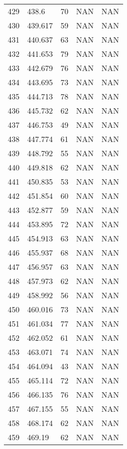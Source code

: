 \documentclass{article}
\begin{document}
\begin{longtable}{@{}lllll@{}}
				429 & 438.6   & 70    & NAN   & NAN   \\
				430 & 439.617 & 59    & NAN   & NAN   \\
				431 & 440.637 & 63    & NAN   & NAN   \\
				432 & 441.653 & 79    & NAN   & NAN   \\
				433 & 442.679 & 76    & NAN   & NAN   \\
				434 & 443.695 & 73    & NAN   & NAN   \\
				435 & 444.713 & 78    & NAN   & NAN   \\
				436 & 445.732 & 62    & NAN   & NAN   \\
				437 & 446.753 & 49    & NAN   & NAN   \\
				438 & 447.774 & 61    & NAN   & NAN   \\
				439 & 448.792 & 55    & NAN   & NAN   \\
				440 & 449.818 & 62    & NAN   & NAN   \\
				441 & 450.835 & 53    & NAN   & NAN   \\
				442 & 451.854 & 60    & NAN   & NAN   \\
				443 & 452.877 & 59    & NAN   & NAN   \\
				444 & 453.895 & 72    & NAN   & NAN   \\
				445 & 454.913 & 63    & NAN   & NAN   \\
				446 & 455.937 & 68    & NAN   & NAN   \\
				447 & 456.957 & 63    & NAN   & NAN   \\
				448 & 457.973 & 62    & NAN   & NAN   \\
				449 & 458.992 & 56    & NAN   & NAN   \\
				450 & 460.016 & 73    & NAN   & NAN   \\
				451 & 461.034 & 77    & NAN   & NAN   \\
				452 & 462.052 & 61    & NAN   & NAN   \\
				453 & 463.071 & 74    & NAN   & NAN   \\
				454 & 464.094 & 43    & NAN   & NAN   \\
				455 & 465.114 & 72    & NAN   & NAN   \\
				456 & 466.135 & 76    & NAN   & NAN   \\
				457 & 467.155 & 55    & NAN   & NAN   \\
				458 & 468.174 & 62    & NAN   & NAN   \\
				459 & 469.19  & 62    & NAN   & NAN   \\

\end{longtable}
\end{document}

